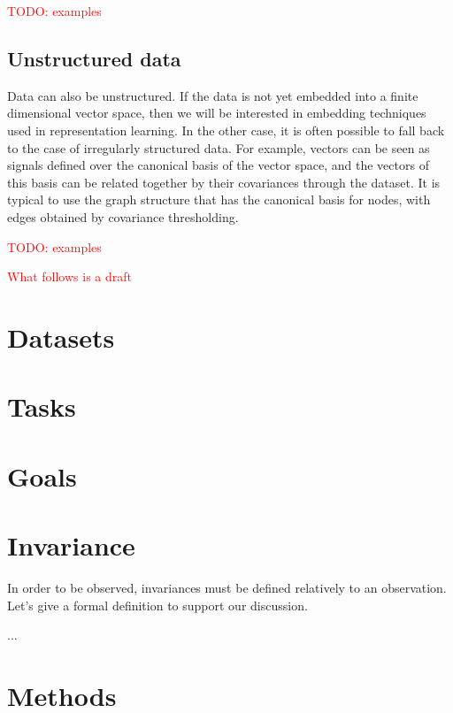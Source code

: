 \textcolor{red}{TODO: examples}

\subsection{Unstructured data}

Data can also be unstructured. If the data is not yet embedded into a finite dimensional vector space, then we will be interested in embedding techniques used in representation learning. In the other case, it is often possible to fall back to the case of irregularly structured data. For example, vectors can be seen as signals defined over the canonical basis of the vector space, and the vectors of this basis can be related together by their covariances through the dataset. It is typical to use the graph structure that has the canonical basis for nodes, with edges obtained by covariance thresholding.

\textcolor{red}{TODO: examples}


%
%
\textcolor{red}{What follows is a draft}




\section{Datasets}

\section{Tasks} %
\label{tasks}



\section{Goals}

\section{Invariance}

In order to be observed, invariances must be defined relatively to an observation. Let's give a formal definition to support our discussion.

...

\section{Methods}
\label{methods}